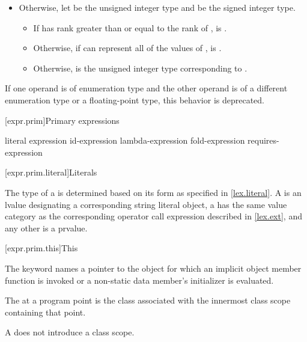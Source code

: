 \begin{itemize}
\begin{itemize}
\item Otherwise, let  be the unsigned integer type and
 be the signed integer type.
\begin{itemize}
\item If  has rank greater than or equal to the rank of ,
 is .
\item Otherwise, if  can represent all of the values of ,
 is .
\item Otherwise,
 is the unsigned integer type corresponding to .
\end{itemize}
\end{itemize}
\end{itemize}

\pnum
If one operand is of enumeration type
and the other operand is of
a different enumeration type or
a floating-point type,
this behavior is deprecated.

[expr.prim]{Primary expressions}%

\begin{bnf}
\br
    literal\br
    \br
    \terminal{(} expression \terminal{)}\br
    id-expression\br
    lambda-expression\br
    fold-expression\br
    requires-expression
\end{bnf}

[expr.prim.literal]{Literals}

\pnum
{}%
%
The type of a 
is determined based on its form as specified in \ref{lex.literal}.
A  is an lvalue
designating a corresponding string literal object,
a 
has the same value category
as the corresponding operator call expression described in \ref{lex.ext},
and any other  is a prvalue.

[expr.prim.this]{This}

\pnum
{}%
The keyword  names a pointer to the object for which an implicit object member
function is invoked or a non-static data member's
initializer is evaluated.

\pnum
The  at a program point is
the class associated with the innermost class scope containing that point.
\begin{note}
A  does not introduce a class scope.
\end{note}

